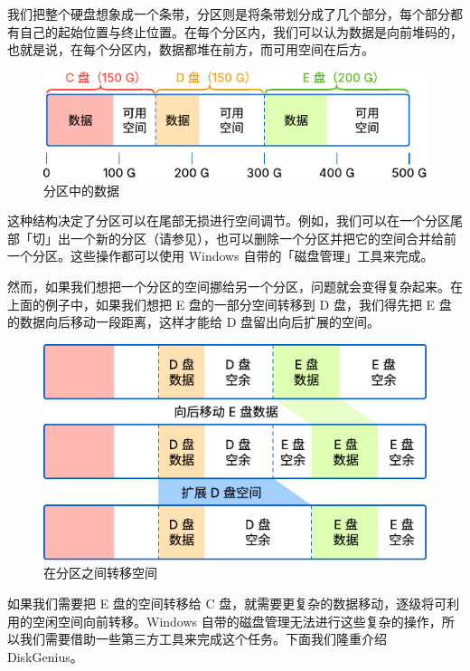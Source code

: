 {我们把整个硬盘想象成一个条带，分区则是将条带划分成了几个部分，每个部分都有自己的起始位置与终止位置。在每个分区内，我们可以认为数据是向前堆码的，也就是说，在每个分区内，数据都堆在前方，而可用空间在后方。

\begin{figure}[htb!]
  \centering
  \includegraphics[width=.85\textwidth]{assets/advanced/Disk_partitions.pdf}
  \caption{分区中的数据}
  \label{fig:Disk_partitions}
\end{figure}

这种结构决定了分区可以在尾部无损进行空间调节。例如，我们可以在一个分区尾部「切」出一个新的分区（请参见），也可以删除一个分区并把它的空间合并给前一个分区。这些操作都可以使用 Windows 自带的「磁盘管理」工具来完成。

然而，如果我们想把一个分区的空间挪给另一个分区，问题就会变得复杂起来。在上面的例子中，如果我们想把 E 盘的一部分空间转移到 D 盘，我们得先把 E 盘的数据向后移动一段距离，这样才能给 D 盘留出向后扩展的空间。

\begin{figure}[htb!]
  \centering
  \includegraphics[width=.85\textwidth]{assets/advanced/Move_space_from_partition_to_partition.pdf}
  \caption{在分区之间转移空间}
  \label{fig:Move_space_from_partition_to_partition}
\end{figure}

如果我们需要把 E 盘的空间转移给 C 盘，就需要更复杂的数据移动，逐级将可利用的空闲空间向前转移。Windows 自带的磁盘管理无法进行这些复杂的操作，所以我们需要借助一些第三方工具来完成这个任务。下面我们隆重介绍 DiskGenius。

}
